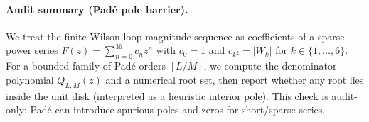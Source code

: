 \paragraph{Audit summary (Padé pole barrier).} \AuditTag We treat the finite Wilson-loop magnitude sequence as coefficients of a sparse power series $F(z)=\sum_{n=0}^{36} c_n z^n$ with $c_0=1$ and $c_{k^2}=|W_k|$ for $k\in\{1,\dots,6\}$. For a bounded family of Padé orders $[L/M]$, we compute the denominator polynomial $Q_{L,M}(z)$ and a numerical root set, then report whether any root lies inside the unit disk (interpreted as a heuristic interior pole). This check is audit-only: Padé can introduce spurious poles and zeros for short/sparse series.